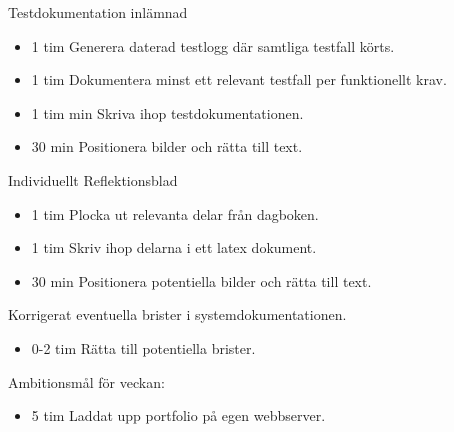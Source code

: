 \documentclass{TDP003mall}
\begin{document}
Testdokumentation inlämnad
\begin{itemize}
  \item 1 tim Generera daterad testlogg där samtliga testfall körts.
  \item 1 tim Dokumentera minst ett relevant testfall per funktionellt krav.
    \item 1 tim min Skriva ihop testdokumentationen.
  \item 30 min Positionera bilder och rätta till text.
\end{itemize}

Individuellt Reflektionsblad
\begin{itemize}
\item 1 tim Plocka ut relevanta delar från dagboken.
  \item 1 tim Skriv ihop delarna i ett latex dokument.
  \item 30 min Positionera potentiella bilder och rätta till text.
  \end{itemize}
  
  Korrigerat eventuella brister i systemdokumentationen.
  \begin{itemize}
  \item 0-2 tim Rätta till potentiella brister.
  \end{itemize}

Ambitionsmål för veckan:
\begin{itemize}
  \item 5 tim Laddat upp portfolio på egen webbserver.
  \end{itemize}
\end{document}

